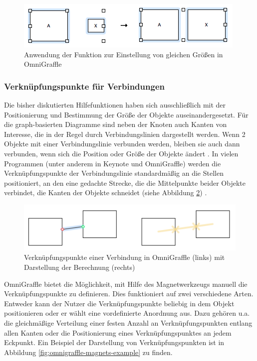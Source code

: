 \begin{figure}[hbt]
    \centering
    \includegraphics{resources/omnigraffle-make-same-size.png}
    \caption{Anwendung der Funktion zur Einstellung von gleichen Größen in OmniGraffle}
    \label{fig:omnigraffle-make-same-size}
\end{figure}

\subsubsection{Verknüpfungspunkte für Verbindungen}


Die bisher diskutierten Hilfefunktionen haben sich ausschließlich mit der Positionierung und Bestimmung der Größe der Objekte auseinandergesetzt. Für die graph-basierten Diagramme sind neben der Knoten auch Kanten von Interesse, die in der Regel durch Verbindungslinien dargestellt werden. Wenn 2 Objekte mit einer Verbindungslinie verbunden werden, bleiben sie auch dann verbunden, wenn sich die Position oder Größe der Objekte ändert \cite{11Keynote}. In vielen Programmen (unter anderem in Keynote und OmniGraffle) werden die Verknüpfungspunkte der Verbindungslinie standardmäßig an die Stellen positioniert, an den eine gedachte Strecke, die die Mittelpunkte beider Objekte verbindet, die Kanten der Objekte schneidet (siehe Abbildung \ref{fig:omnigraffle-default-connection-points}) \cite{08OmniGraffle}.

\begin{figure}[hbt]
    \centering
    \includegraphics{resources/omnigraffle-default-connection-points.png}
    \caption{Verknüpfungspunkte einer Verbindung in OmniGraffle (links) mit Darstellung der Berechnung (rechts)}
    \label{fig:omnigraffle-default-connection-points}
\end{figure}

OmniGraffle bietet die Möglichkeit, mit Hilfe des Magnetwerkzeugs manuell die Verknüpfungspunkte zu definieren. Dies funktioniert auf zwei verschiedene Arten. Entweder kann der Nutzer die Verknüpfungspunkte beliebig in dem Objekt positionieren oder er wählt eine vordefinierte Anordnung aus. Dazu gehören u.a. die gleichmäßige Verteilung einer festen Anzahl an Verknüpfungspunkten entlang allen Kanten oder die Positionierung eines Verknüpfungspunktes an jedem Eckpunkt. Ein Beispiel der Darstellung von Verknüpfungspunkten ist in Abbildung \ref{fig:omnigraffle-magnets-example} zu finden.

